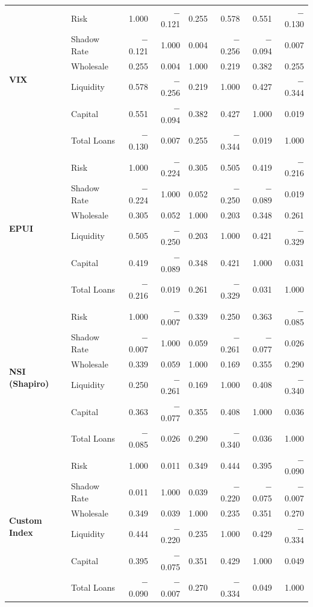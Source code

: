 \documentclass[12pt,a4paper]{report}\usepackage[a4paper, top=2.5cm, bottom=2.5cm, left=2.5cm, right=2.5cm]{geometry}
\begin{document}
\begin{table}[H]
{\begin{tabular}{ll rrrrrr}
\multirow{6}{*}{\textbf{VIX}}
 & Risk          &  1.000 & $-$0.121 &  0.255 &  0.578 &  0.551 & $-$0.130 \\
 & Shadow Rate   & $-$0.121 &  1.000 &  0.004 & $-$0.256 & $-$0.094 &  0.007 \\
 & Wholesale     &  0.255 &  0.004 &  1.000 &  0.219 &  0.382 &  0.255 \\
 & Liquidity     &  0.578 & $-$0.256 &  0.219 &  1.000 &  0.427 & $-$0.344 \\
 & Capital       &  0.551 & $-$0.094 &  0.382 &  0.427 &  1.000 &  0.019 \\
 & Total Loans   & $-$0.130 &  0.007 &  0.255 & $-$0.344 &  0.019 &  1.000 \\
\midrule

\multirow{6}{*}{\textbf{EPUI}}
 & Risk          &  1.000 & $-$0.224 &  0.305 &  0.505 &  0.419 & $-$0.216 \\
 & Shadow Rate   & $-$0.224 &  1.000 &  0.052 & $-$0.250 & $-$0.089 &  0.019 \\
 & Wholesale     &  0.305 &  0.052 &  1.000 &  0.203 &  0.348 &  0.261 \\
 & Liquidity     &  0.505 & $-$0.250 &  0.203 &  1.000 &  0.421 & $-$0.329 \\
 & Capital       &  0.419 & $-$0.089 &  0.348 &  0.421 &  1.000 &  0.031 \\
 & Total Loans   & $-$0.216 &  0.019 &  0.261 & $-$0.329 &  0.031 &  1.000 \\
\midrule

\multirow{6}{*}{\textbf{NSI (Shapiro)}}
 & Risk          &  1.000 & $-$0.007 &  0.339 &  0.250 &  0.363 & $-$0.085 \\
 & Shadow Rate   & $-$0.007 &  1.000 &  0.059 & $-$0.261 & $-$0.077 &  0.026 \\
 & Wholesale     &  0.339 &  0.059 &  1.000 &  0.169 &  0.355 &  0.290 \\
 & Liquidity     &  0.250 & $-$0.261 &  0.169 &  1.000 &  0.408 & $-$0.340 \\
 & Capital       &  0.363 & $-$0.077 &  0.355 &  0.408 &  1.000 &  0.036 \\
 & Total Loans   & $-$0.085 &  0.026 &  0.290 & $-$0.340 &  0.036 &  1.000 \\
\midrule

\multirow{6}{*}{\textbf{Custom Index}}
 & Risk          &  1.000 &  0.011 &  0.349 &  0.444 &  0.395 & $-$0.090 \\
 & Shadow Rate   &  0.011 &  1.000 &  0.039 & $-$0.220 & $-$0.075 & $-$0.007 \\
 & Wholesale     &  0.349 &  0.039 &  1.000 &  0.235 &  0.351 &  0.270 \\
 & Liquidity     &  0.444 & $-$0.220 &  0.235 &  1.000 &  0.429 & $-$0.334 \\
 & Capital       &  0.395 & $-$0.075 &  0.351 &  0.429 &  1.000 &  0.049 \\
 & Total Loans   & $-$0.090 & $-$0.007 &  0.270 & $-$0.334 &  0.049 &  1.000 \\

\bottomrule
\end{tabular}%
}
\end{table}
\end{document}
